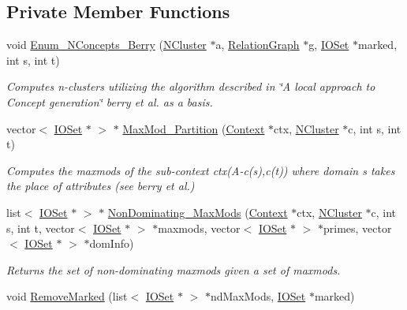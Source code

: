 \subsection*{Private Member Functions}
\begin{DoxyCompactItemize}
\item 
void \hyperlink{class_berry_lattice_algos_a0b2fefa9adf415442438b1bedbbfd317}{Enum\_\-NConcepts\_\-Berry} (\hyperlink{class_n_cluster}{NCluster} $\ast$a, \hyperlink{class_relation_graph}{RelationGraph} $\ast$g, \hyperlink{class_i_o_set}{IOSet} $\ast$marked, int s, int t)
\begin{DoxyCompactList}\small\item\em Computes n-\/clusters utilizing the algorithm described in \char`\"{}A local approach to Concept generation\char`\"{} berry et al. as a basis. \item\end{DoxyCompactList}\item 
vector$<$ \hyperlink{class_i_o_set}{IOSet} $\ast$ $>$ $\ast$ \hyperlink{class_berry_lattice_algos_a9aebe3a001353fc0b200f0c121def7fc}{MaxMod\_\-Partition} (\hyperlink{class_context}{Context} $\ast$ctx, \hyperlink{class_n_cluster}{NCluster} $\ast$c, int s, int t)
\begin{DoxyCompactList}\small\item\em Computes the maxmods of the sub-\/context ctx(A-\/c(s),c(t)) where domain s takes the place of attributes (see berry et al.) \item\end{DoxyCompactList}\item 
list$<$ \hyperlink{class_i_o_set}{IOSet} $\ast$ $>$ $\ast$ \hyperlink{class_berry_lattice_algos_a8edc5b3fcb0f597ccca4324fdee0deec}{NonDominating\_\-MaxMods} (\hyperlink{class_context}{Context} $\ast$ctx, \hyperlink{class_n_cluster}{NCluster} $\ast$c, int s, int t, vector$<$ \hyperlink{class_i_o_set}{IOSet} $\ast$ $>$ $\ast$maxmods, vector$<$ \hyperlink{class_i_o_set}{IOSet} $\ast$ $>$ $\ast$primes, vector$<$ \hyperlink{class_i_o_set}{IOSet} $\ast$ $>$ $\ast$domInfo)
\begin{DoxyCompactList}\small\item\em Returns the set of non-\/dominating maxmods given a set of maxmods. \item\end{DoxyCompactList}\item 
void \hyperlink{class_berry_lattice_algos_a4e77968caf06f4b29704062c6834a329}{RemoveMarked} (list$<$ \hyperlink{class_i_o_set}{IOSet} $\ast$ $>$ $\ast$ndMaxMods, \hyperlink{class_i_o_set}{IOSet} $\ast$marked)

\end{DoxyCompactItemize}
